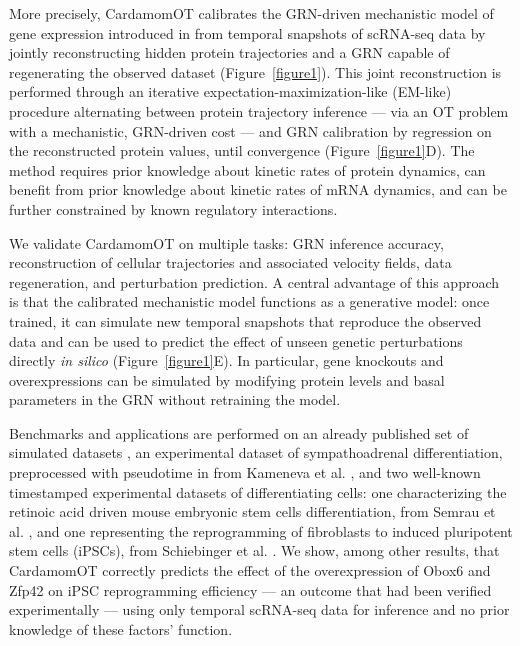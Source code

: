 \documentclass[a4paper, 11pt]{article}
\theoremstyle{plain}
\theoremstyle{remark}
\begin{document}
More precisely, CardamomOT calibrates the GRN-driven mechanistic model of gene expression introduced in \cite{herbachinferring2017, ventre2023one} from temporal snapshots of scRNA-seq data by jointly reconstructing hidden protein trajectories and a GRN capable of regenerating the observed dataset (Figure~\ref{figure1}). This joint reconstruction is performed through an iterative expectation-maximization-like (EM-like) procedure alternating between protein trajectory inference — via an OT problem with a mechanistic, GRN-driven cost — and GRN calibration by regression on the reconstructed protein values, until convergence (Figure~\ref{figure1}D). The method requires prior knowledge about kinetic rates of protein dynamics, can benefit from prior knowledge about kinetic rates of mRNA dynamics, and can be further constrained by known regulatory interactions.

We validate CardamomOT on multiple tasks: GRN inference accuracy, reconstruction of cellular trajectories and associated velocity fields, data regeneration, and perturbation prediction. A central advantage of this approach is that the calibrated mechanistic model functions as a generative model: once trained, it can simulate new temporal snapshots that reproduce the observed data and can be used to predict the effect of unseen genetic perturbations directly \textit{in silico} (Figure~\ref{figure1}E). In particular, gene knockouts and overexpressions can be simulated by modifying protein levels and basal parameters in the GRN without retraining the model. 

Benchmarks and applications are performed on an already published set of simulated datasets \cite{ventre2023one}, an experimental dataset of sympathoadrenal differentiation, preprocessed with pseudotime in \cite{gandrillon2025inferring} from Kameneva et al. \cite{kameneva2021single}, and two well-known timestamped experimental datasets of differentiating cells: one characterizing the retinoic acid driven mouse embryonic stem cells differentiation, from Semrau et al. \cite{Semrau_2017}, and one representing the reprogramming of fibroblasts to induced pluripotent stem cells (iPSCs), from Schiebinger et al. \cite{schiebinger2019optimal}.
We show, among other results, that CardamomOT correctly predicts the effect of the overexpression of {Obox6} and {Zfp42} on iPSC reprogramming efficiency \cite{schiebinger2019optimal} — an outcome that had been verified experimentally — using only temporal scRNA-seq data for inference and no prior knowledge of these factors' function.
\end{document}
